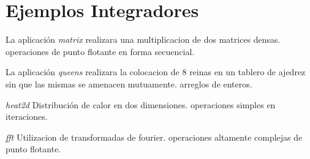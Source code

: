\documentclass[a4paper,twocolumn]{article}
\begin{document}
\appendix

\section{Ejemplos Integradores}

La aplicaci\'on \emph{matrix} realizara una multiplicacion de dos matrices densas.
operaciones de punto flotante en forma secuencial.

La aplicaci\'on \emph{queens} realizara la colocacion de 8 reinas en un tablero de
ajedrez sin que las mismas se amenacen mutuamente. arreglos de enteros.

\emph{heat2d} Distribuci\'on de calor en dos dimensiones.
operaciones simples en iteraciones.

\emph{fft} Utilizacion de transformadas de fourier.
operaciones altamente complejas de punto flotante.
\end{document}
